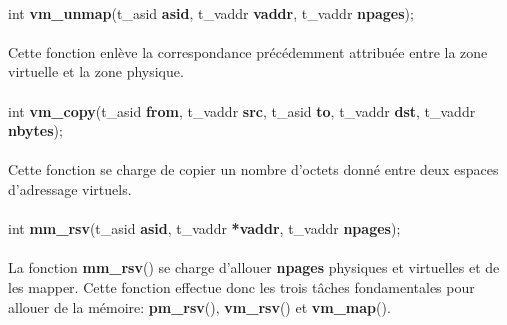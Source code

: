 \documentclass[10pt,a4wide]{article}
\begin{document}
\paragraph{}

\hspace{1.5cm}int \textbf{vm\_unmap}(t\_asid \textbf{asid},
                                     t\_vaddr \textbf{vaddr},
                                     t\_vaddr \textbf{npages});

\paragraph{}

Cette fonction enl\`eve la correspondance pr\'ec\'edemment attribu\'ee entre
la zone virtuelle et la zone physique.

\paragraph{}

\hspace{1.5cm}int \textbf{vm\_copy}(t\_asid \textbf{from},
                                    t\_vaddr \textbf{src},
                                    t\_asid \textbf{to},
                                    t\_vaddr \textbf{dst},
                                    t\_vaddr \textbf{nbytes});

\paragraph{}

Cette fonction se charge de copier un nombre d'octets donn\'e entre
deux espaces d'adressage virtuels.

\paragraph{}

\hspace{1.5cm}int \textbf{mm\_rsv}(t\_asid \textbf{asid},
                                   t\_vaddr \textbf{*vaddr},
                                   t\_vaddr \textbf{npages});

\paragraph{}

La fonction \textbf{mm\_rsv}() se charge d'allouer \textbf{npages} physiques
et virtuelles et de les mapper. Cette fonction effectue donc les trois
t\^aches fondamentales pour allouer de la m\'emoire: \textbf{pm\_rsv}(),
\textbf{vm\_rsv}() et \textbf{vm\_map}().
\end{document}
